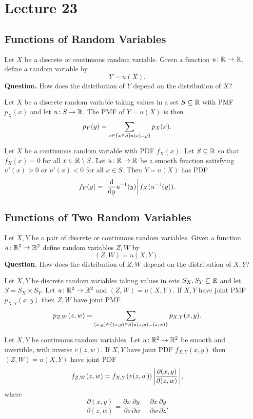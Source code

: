 \documentclass[class=article, crop=false]{standalone}
\begin{document}
  \section{Lecture 23}
  \subsection{Functions of Random Variables}
  Let $X$ be a discrete or continuous random variable. Given a function $u\colon \mathbb{R}\to \mathbb{R}$, define a random variable by
  \[
    Y = u(X).
  \]
  \textbf{Question.} How does the distribution of $Y$ depend on the distribution of $X$?
  \begin{theorem}{}
    Let $X$ be a discrete random variable taking values in a set $S\subseteq \mathbb{R}$ with PMF $p_X(x)$ and let $u\colon S\to \mathbb{R}$. The PMF of $Y = u(X)$ is then
    \[
      p_Y(y) = \sum_{x\in \left\{x\in S\mid u(x) = y\right\}}p_X(x).
    \]
  \end{theorem}
  \begin{theorem}{}
    Let $X$ be a continuous random variable with PDF $f_X(x)$. Let $S\subseteq\mathbb{R}$ so that $f_X(x) = 0$ for all $x\in \mathbb{R}\setminus S$. Let $u\colon \mathbb{R}\to \mathbb{R}$ be a smooth function satisfying $u'(x) > 0$ or $u'(x) < 0$ for all $x\in S$. Then $Y = u(X)$ has PDF
    \[
      f_Y(y) = \left\lvert \frac{\mathrm{d}}{\mathrm{d}y}u^{-1}(y) \right\rvert f_X(u^{-1}(y)).
    \]
  \end{theorem}
  \subsection{Functions of Two Random Variables}
  Let $X, Y$ be a pair of discrete or continuous random variables. Given a function $u\colon \mathbb{R}^2\to \mathbb{R}^2$ define random variables $Z, W$ by 
  \[
    (Z, W) = u(X, Y).
  \]
  \textbf{Question.} How does the distribution of $Z, W$ depend on the distribution of $X, Y$?
  \begin{theorem}{}
    Let $X, Y$ be discrete random variables taking values in sets $S_X, S_Y\subseteq\mathbb{R}$ and let $S = S_X\times S_Y$. Let $u\colon \mathbb{R}^2\to \mathbb{R}^2$ and $(Z, W) = u(X, Y)$. If $X, Y$ have joint PMF $p_{X, Y}(x, y)$ then $Z, W$ have joint PMF
    \[
      p_{Z, W}(z, w) = \sum_{(x, y)\in \left\{(x, y)\in S\mid u(x, y) = (z, w)\right\}} p_{X, Y}(x, y).
    \]
  \end{theorem}
  \begin{theorem}{}
    Let $X, Y$ be continuous random variables. Let $u\colon \mathbb{R}^2\to \mathbb{R}^2$ be smooth and invertible, with inverse $v(z, w)$. If $X, Y$ have joint PDF $f_{X, Y}(x, y)$ then $(Z, W) = u(X, Y)$ have joint PDF
    \[
      f_{Z, W}(z, w) = f_{X, Y}(v(z, w))\left\lvert \frac{\partial(x, y)}{\partial(z, w)} \right\rvert,
    \]
    where
    \[
      \frac{\partial(x, y)}{\partial(z, w)} = \frac{\partial x}{\partial z}\frac{\partial y}{\partial w} - \frac{\partial x}{\partial w}\frac{\partial y}{\partial z}.
    \]
  \end{theorem}
\end{document}
